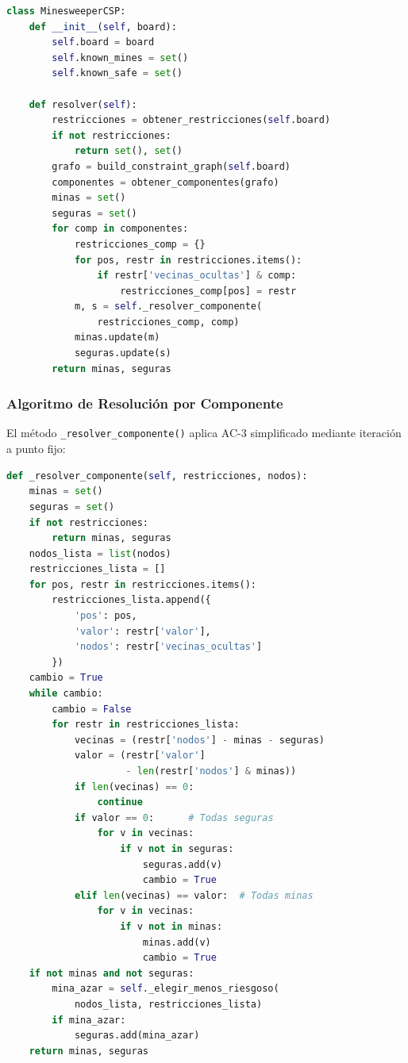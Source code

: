 \documentclass[12pt,a4paper]{article}
\begin{document}
\begin{lstlisting}[language=Python, caption={Clase MinesweeperCSP.}]
class MinesweeperCSP:
    def __init__(self, board):
        self.board = board
        self.known_mines = set()
        self.known_safe = set()

    def resolver(self):
        restricciones = obtener_restricciones(self.board)
        if not restricciones:
            return set(), set()
        grafo = build_constraint_graph(self.board)
        componentes = obtener_componentes(grafo)
        minas = set()
        seguras = set()
        for comp in componentes:
            restricciones_comp = {}
            for pos, restr in restricciones.items():
                if restr['vecinas_ocultas'] & comp:
                    restricciones_comp[pos] = restr
            m, s = self._resolver_componente(
                restricciones_comp, comp)
            minas.update(m)
            seguras.update(s)
        return minas, seguras
\end{lstlisting}

\subsubsection{Algoritmo de Resolución por Componente}

El método \texttt{\_resolver\_componente()} aplica AC-3 simplificado mediante iteración a punto fijo:

\begin{lstlisting}[language=Python, caption={Resolución de una componente CSP.}]
def _resolver_componente(self, restricciones, nodos):
    minas = set()
    seguras = set()
    if not restricciones:
        return minas, seguras
    nodos_lista = list(nodos)
    restricciones_lista = []
    for pos, restr in restricciones.items():
        restricciones_lista.append({
            'pos': pos,
            'valor': restr['valor'],
            'nodos': restr['vecinas_ocultas']
        })
    cambio = True
    while cambio:
        cambio = False
        for restr in restricciones_lista:
            vecinas = (restr['nodos'] - minas - seguras)
            valor = (restr['valor']
                     - len(restr['nodos'] & minas))
            if len(vecinas) == 0:
                continue
            if valor == 0:      # Todas seguras
                for v in vecinas:
                    if v not in seguras:
                        seguras.add(v)
                        cambio = True
            elif len(vecinas) == valor:  # Todas minas
                for v in vecinas:
                    if v not in minas:
                        minas.add(v)
                        cambio = True
    if not minas and not seguras:
        mina_azar = self._elegir_menos_riesgoso(
            nodos_lista, restricciones_lista)
        if mina_azar:
            seguras.add(mina_azar)
    return minas, seguras
\end{lstlisting}
\end{document}
